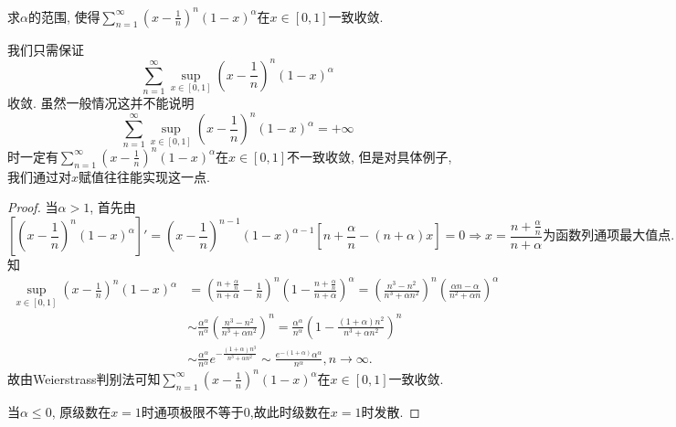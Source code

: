 \documentclass[../../main.tex]{subfiles}
\begin{document}
\begin{example}
求$\alpha$的范围, 使得$\sum\limits_{n=1}^{\infty}\left(x-\frac{1}{n}\right)^n(1-x)^\alpha$在$x\in[0,1]$一致收敛.
\end{example}
\begin{note}
我们只需保证
$$
\sum_{n=1}^{\infty}\sup_{x\in[0,1]}\left(x-\frac{1}{n}\right)^n(1-x)^\alpha
$$
收敛. 虽然一般情况这并不能说明
$$
\sum_{n=1}^{\infty}\sup_{x\in[0,1]}\left(x-\frac{1}{n}\right)^n(1-x)^\alpha=+\infty
$$
时一定有$\sum\limits_{n=1}^{\infty}\left(x-\frac{1}{n}\right)^n(1-x)^\alpha$在$x\in[0,1]$不一致收敛, 但是对具体例子, 我们通过对$x$赋值往往能实现这一点.
\end{note}
\begin{proof}
当$\alpha>1$, 首先由
$$
\left[\left(x-\frac{1}{n}\right)^n(1-x)^\alpha\right]'=\left(x-\frac{1}{n}\right)^{n-1}(1-x)^{\alpha-1}\left[n+\frac{\alpha}{n}-(n+\alpha)x\right]=0\Rightarrow x=\frac{n+\frac{\alpha}{n}}{n+\alpha}\text{为函数列通项最大值点}.
$$
知
\begin{align*}
\mathop {\mathrm{sup}} \limits_{x\in [0,1]}\left( x-\frac{1}{n} \right) ^n(1-x)^{\alpha}&=\left( \frac{n+\frac{\alpha}{n}}{n+\alpha}-\frac{1}{n} \right) ^n\left( 1-\frac{n+\frac{\alpha}{n}}{n+\alpha} \right) ^{\alpha}=\left( \frac{n^3-n^2}{n^3+\alpha n^2} \right) ^n\left( \frac{\alpha n-\alpha}{n^2+\alpha n} \right) ^{\alpha}
\\
&\sim \frac{\alpha ^{\alpha}}{n^{\alpha}}\left( \frac{n^3-n^2}{n^3+\alpha n^2} \right) ^n=\frac{\alpha ^{\alpha}}{n^{\alpha}}\left( 1-\frac{\left( 1+\alpha \right) n^2}{n^3+\alpha n^2} \right) ^n
\\
&\sim \frac{\alpha ^{\alpha}}{n^{\alpha}}e^{-\frac{\left( 1+\alpha \right) n^3}{n^3+\alpha n^2}}\sim \frac{e^{-(1+\alpha)}\alpha ^{\alpha}}{n^{\alpha}},n\rightarrow \infty .
\end{align*}
故由Weierstrass判别法可知$\sum\limits_{n=1}^{\infty}\left(x-\frac{1}{n}\right)^n(1-x)^\alpha$在$x\in[0,1]$一致收敛.

当$\alpha\leqslant0$, 原级数在$x=1$时通项极限不等于0,故此时级数在$x=1$时发散.


\end{proof}
\end{document}
